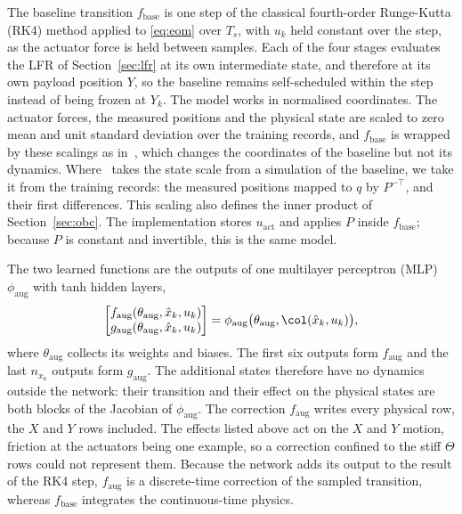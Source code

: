 The baseline transition $f_{\mathrm{base}}$ is one step of the classical
fourth-order Runge-Kutta (RK4) method applied to \eqref{eq:eom} over $T_s$,
with $u_k$ held constant over the step, as the actuator force is held between
samples.
Each of the four stages evaluates the LFR of Section~\ref{sec:lfr} at its own
intermediate state, and therefore at its own payload position $Y$, so the
baseline remains self-scheduled within the step instead of being frozen at
$Y_k$.
The model works in normalised coordinates.
The actuator forces, the measured positions and the physical state are
scaled to zero mean and unit standard deviation over the training records,
and $f_{\mathrm{base}}$ is wrapped by these scalings
as in~\cite[Sec.~5.3, Eq.~(28)]{hoekstra2026lfr}, which changes the
coordinates of the baseline but not its dynamics.
Where~\cite{hoekstra2026lfr} takes the state scale from a simulation of the
baseline, we take it from the training records: the measured positions mapped to $q$
by $P^{-\top}$, and their first differences.
This scaling also defines the inner product of Section~\ref{sec:obc}.
The implementation stores $u_{\mathrm{act}}$ and applies $P$ inside
$f_{\mathrm{base}}$; because $P$ is constant and invertible, this is the same
model.

The two learned functions are the outputs of one multilayer perceptron (MLP)
$\phi_{\mathrm{aug}}$ with tanh hidden layers,
\begin{equation}
 \begin{bmatrix}
  f_{\mathrm{aug}}(\theta_{\mathrm{aug}},\hat x_k,u_k)\\
  g_{\mathrm{aug}}(\theta_{\mathrm{aug}},\hat x_k,u_k)
 \end{bmatrix}
 =\phi_{\mathrm{aug}}\bigl(\theta_{\mathrm{aug}},\col(\hat x_k,u_k)\bigr),
 \label{eq:aug_mlp}
\end{equation}
where $\theta_{\mathrm{aug}}$ collects its weights and biases.
The first six outputs form $f_{\mathrm{aug}}$ and the last $n_{x_a}$ outputs
form $g_{\mathrm{aug}}$.
The additional states therefore have no dynamics outside the network: their
transition and their effect on the physical states are both blocks of the
Jacobian of $\phi_{\mathrm{aug}}$.
The correction $f_{\mathrm{aug}}$ writes every physical row, the $X$ and $Y$
rows included.
The effects listed above act on the $X$ and $Y$ motion, friction at the
actuators being one example, so a correction confined to the stiff $\Theta$
rows could not represent them.
Because the network adds its output to the result of the RK4 step,
$f_{\mathrm{aug}}$ is a discrete-time correction of the sampled transition,
whereas $f_{\mathrm{base}}$ integrates the continuous-time physics.

